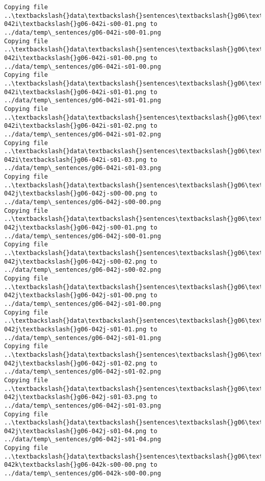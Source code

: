 \documentclass[11pt]{article}
\begin{document}
\begin{Verbatim}[commandchars=\\\{\}]
Copying file ..\textbackslash{}data\textbackslash{}sentences\textbackslash{}g06\textbackslash{}g06-042i\textbackslash{}g06-042i-s00-01.png to
../data/temp\_sentences/g06-042i-s00-01.png
Copying file ..\textbackslash{}data\textbackslash{}sentences\textbackslash{}g06\textbackslash{}g06-042i\textbackslash{}g06-042i-s01-00.png to
../data/temp\_sentences/g06-042i-s01-00.png
Copying file ..\textbackslash{}data\textbackslash{}sentences\textbackslash{}g06\textbackslash{}g06-042i\textbackslash{}g06-042i-s01-01.png to
../data/temp\_sentences/g06-042i-s01-01.png
Copying file ..\textbackslash{}data\textbackslash{}sentences\textbackslash{}g06\textbackslash{}g06-042i\textbackslash{}g06-042i-s01-02.png to
../data/temp\_sentences/g06-042i-s01-02.png
Copying file ..\textbackslash{}data\textbackslash{}sentences\textbackslash{}g06\textbackslash{}g06-042i\textbackslash{}g06-042i-s01-03.png to
../data/temp\_sentences/g06-042i-s01-03.png
Copying file ..\textbackslash{}data\textbackslash{}sentences\textbackslash{}g06\textbackslash{}g06-042j\textbackslash{}g06-042j-s00-00.png to
../data/temp\_sentences/g06-042j-s00-00.png
Copying file ..\textbackslash{}data\textbackslash{}sentences\textbackslash{}g06\textbackslash{}g06-042j\textbackslash{}g06-042j-s00-01.png to
../data/temp\_sentences/g06-042j-s00-01.png
Copying file ..\textbackslash{}data\textbackslash{}sentences\textbackslash{}g06\textbackslash{}g06-042j\textbackslash{}g06-042j-s00-02.png to
../data/temp\_sentences/g06-042j-s00-02.png
Copying file ..\textbackslash{}data\textbackslash{}sentences\textbackslash{}g06\textbackslash{}g06-042j\textbackslash{}g06-042j-s01-00.png to
../data/temp\_sentences/g06-042j-s01-00.png
Copying file ..\textbackslash{}data\textbackslash{}sentences\textbackslash{}g06\textbackslash{}g06-042j\textbackslash{}g06-042j-s01-01.png to
../data/temp\_sentences/g06-042j-s01-01.png
Copying file ..\textbackslash{}data\textbackslash{}sentences\textbackslash{}g06\textbackslash{}g06-042j\textbackslash{}g06-042j-s01-02.png to
../data/temp\_sentences/g06-042j-s01-02.png
Copying file ..\textbackslash{}data\textbackslash{}sentences\textbackslash{}g06\textbackslash{}g06-042j\textbackslash{}g06-042j-s01-03.png to
../data/temp\_sentences/g06-042j-s01-03.png
Copying file ..\textbackslash{}data\textbackslash{}sentences\textbackslash{}g06\textbackslash{}g06-042j\textbackslash{}g06-042j-s01-04.png to
../data/temp\_sentences/g06-042j-s01-04.png
Copying file ..\textbackslash{}data\textbackslash{}sentences\textbackslash{}g06\textbackslash{}g06-042k\textbackslash{}g06-042k-s00-00.png to
../data/temp\_sentences/g06-042k-s00-00.png

\end{Verbatim}
\end{document}
